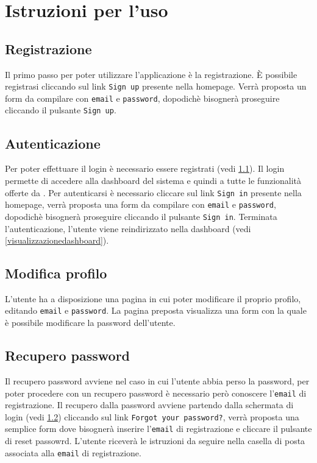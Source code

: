 \section{Istruzioni per l'uso}

	\subsection{Registrazione}
	\label{registrazione}
	Il primo passo per poter utilizzare l'applicazione  è la registrazione. \`E possibile registrasi cliccando sul link \texttt{Sign up} presente nella homepage. Verrà proposta un form da compilare con \texttt{email} e \texttt{password}, dopodichè bisognerà proseguire cliccando il pulsante \texttt{Sign up}.  

	\subsection{Autenticazione}
	\label{autenticazione}
	Per poter effettuare il login è necessario essere registrati (vedi \ref{registrazione}). Il login permette di accedere alla dashboard del sistema e quindi a tutte le funzionalità offerte da . Per autenticarsi è necessario cliccare sul link \texttt{Sign in} presente nella homepage, verrà proposta una form da compilare con \texttt{email} e \texttt{password}, dopodichè bisognerà proseguire cliccando il pulsante \texttt{Sign in}. Terminata l'autenticazione, l'utente viene reindirizzato nella dashboard (vedi \ref{visualizzazionedashboard}).

	\subsection{Modifica profilo}
	\label{modificaprofilo}
	L'utente ha a disposizione una pagina in cui poter modificare il proprio profilo, editando \texttt{email} e \texttt{password}. La pagina preposta visualizza una form con la quale è possibile modificare la password dell'utente.

	\subsection{Recupero password}
	\label{recuperopassword}
	Il recupero password avviene nel caso in cui l'utente abbia perso la password, per poter procedere con un recupero password è necessario però conoscere l'\texttt{email} di registrazione. Il recupero dalla password avviene partendo dalla schermata di login (vedi \ref{autenticazione}) cliccando sul link \texttt{Forgot your password?}, verrà proposta una semplice form dove bisognerà inserire l'\texttt{email} di registrazione e cliccare il pulsante di reset passowrd. 
	L'utente riceverà le istruzioni da seguire nella casella di posta associata alla \texttt{email} di registrazione.

